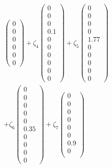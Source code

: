 \documentclass[a4paper,12pt]{article}
\begin{document}
\[\begin{array}{l}
\begin{pmatrix}
    0 \\ 
    0 \\ 
    0 \\ 
    0 \\ 
    0 \\
    0
    \end{pmatrix}
    + \zeta_4 
    \begin{pmatrix}
    0 \\ 
    0 \\ 
    0 \\
    0.1 \\ 
    0 \\ 
    0 \\ 
    0 \\ 
    0 \\ 
    0 \\
    0
    \end{pmatrix}
    + \zeta_5 
    \begin{pmatrix}
    0 \\ 
    0 \\ 
    0\\
    0 \\ 
    1.77 \\ 
    0 \\ 
    0 \\ 
    0 \\ 
    0 \\
    0
    \end{pmatrix}
    \\[10pt]
    + \zeta_6 
    \begin{pmatrix}
    0 \\ 
    0 \\ 
    0 \\
    0 \\ 
    0 \\ 
    0.35 \\ 
    0 \\ 
    0 \\ 
    0 \\
    0
    \end{pmatrix}
    + \zeta_7 
    \begin{pmatrix}
    0 \\ 
    0 \\ 
    0 \\
    0 \\ 
    0 \\ 
    0 \\ 
    0.9 \\ 
    0 \\ 

\end{pmatrix}
\end{array}\]
\end{document}
